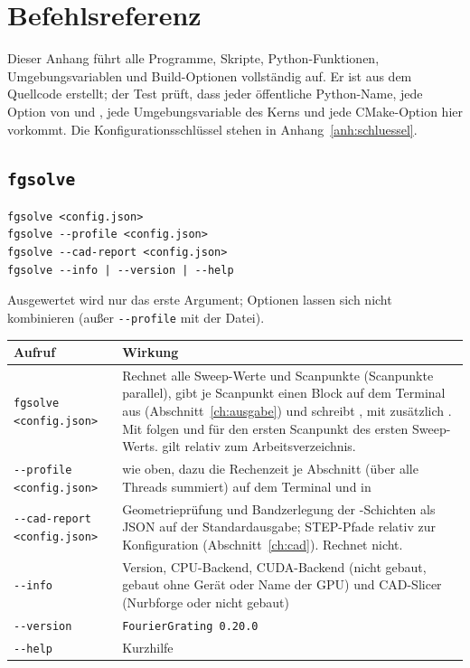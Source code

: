 \chapter{Befehlsreferenz}\label{anh:cli}
Dieser Anhang führt alle Programme, Skripte, Python-Funktionen, Umgebungsvariablen und Build-Optionen vollständig
auf. Er ist aus dem Quellcode erstellt; der Test  prüft, dass jeder
öffentliche Python-Name, jede Option von  und , jede Umgebungsvariable des Kerns und jede
CMake-Option hier vorkommt. Die Konfigurationsschlüssel stehen in Anhang~\ref{anh:schluessel}.

\section{\texttt{fgsolve}}\label{sec:ref-fgsolve}
\begin{lstlisting}[style=shell]
fgsolve <config.json>
fgsolve --profile <config.json>
fgsolve --cad-report <config.json>
fgsolve --info | --version | --help
\end{lstlisting}
Ausgewertet wird nur das erste Argument; Optionen lassen sich nicht kombinieren (außer \texttt{-{}-profile} mit
der Datei).
\begin{center}
\small
\begin{tabularx}{\linewidth}{>{\raggedright\arraybackslash}p{4.4cm}Y}
\toprule
Aufruf & Wirkung \\
\midrule
\texttt{fgsolve <config.json>} & Rechnet alle Sweep-Werte und Scanpunkte
(Scanpunkte parallel), gibt je Scanpunkt einen Block auf dem Terminal aus (Abschnitt~\ref{ch:ausgabe}) und schreibt
, mit  zusätzlich . Mit
 folgen  und  für den
ersten Scanpunkt des ersten Sweep-Werts.  gilt relativ zum Arbeitsverzeichnis. \\
\texttt{-{}-profile <config.json>} & wie oben, dazu die Rechenzeit je Abschnitt
(über alle Threads summiert) auf dem Terminal und in  \\
\texttt{-{}-cad-report <config.json>} & Geometrieprüfung und Bandzerlegung
der -Schichten als JSON auf der Standardausgabe; STEP-Pfade relativ zur Konfiguration
(Abschnitt~\ref{ch:cad}). Rechnet nicht. \\
\texttt{-{}-info} & Version, CPU-Backend, CUDA-Backend (nicht gebaut, gebaut ohne Gerät
oder Name der GPU) und CAD-Slicer (Nurbforge oder nicht gebaut) \\
\texttt{-{}-version} & \texttt{FourierGrating 0.20.0} \\
\texttt{-{}-help} & Kurzhilfe \\
\bottomrule
\end{tabularx}
\end{center}
